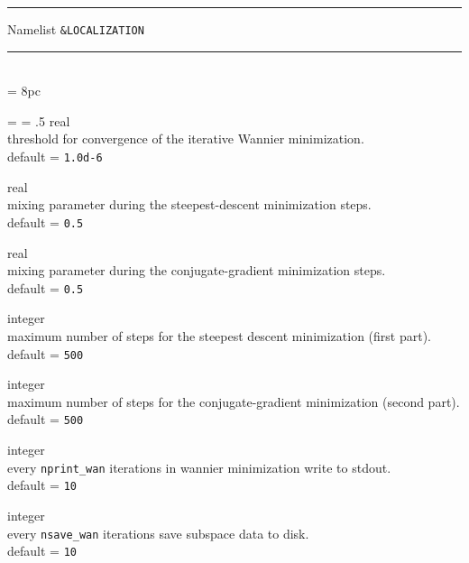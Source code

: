 \begin{centering}
\rule{2.2in}{0.01in} Namelist {\tt \&LOCALIZATION} \rule{2.2in}{0.01in}
\end{centering}\\

\newdimen\descindent \descindent = 8pc
{\noindent \leftskip = \descindent \parskip = .5\baselineskip
{}%
{\sc real} \\ threshold for convergence of the iterative Wannier minimization.
\\ {\sc default} = {\tt 1.0d-6} \par

\noindent{}%
{\sc real} \\ mixing parameter during the steepest-descent minimization steps. \\
{\sc default} = {\tt 0.5} \par

\noindent{}%
{\sc real} \\ mixing parameter during the conjugate-gradient minimization steps. \\
{\sc default} = {\tt 0.5} \par

\noindent{}%
{\sc integer} \\ maximum number of steps for the steepest descent
minimization (first part).\\ {\sc default} = {\tt 500} \par

\noindent{}%
{\sc integer} \\ maximum number of steps for the conjugate-gradient minimization
(second part).\\ {\sc default} = {\tt 500 }\par

\noindent{}%
{\sc integer} \\ every {\tt nprint\_wan} iterations in wannier minimization write to stdout.\\
{\sc default} = {\tt 10 }\par

\noindent{}%
{\sc integer} \\ every {\tt nsave\_wan} iterations save subspace data to disk.\\
{\sc default} = {\tt 10 }\par

}
